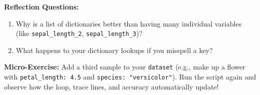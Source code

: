 \textbf{Reflection Questions:}
\begin{enumerate}
    \item Why is a list of dictionaries better than having many individual variables (like \texttt{sepal\_length\_2}, \texttt{sepal\_length\_3})?
    \item What happens to your dictionary lookups if you misspell a key?
\end{enumerate}

\textbf{Micro-Exercise:} Add a third sample to your \texttt{dataset} (e.g., make up a flower with \texttt{petal\_length: 4.5} and \texttt{species: "versicolor"}). Run the script again and observe how the loop, trace lines, and accuracy automatically update!
